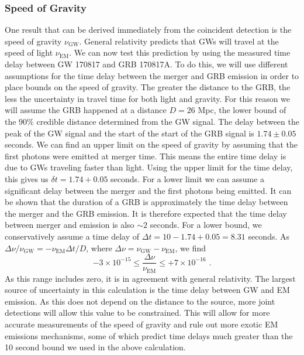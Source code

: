 \documentclass[11pt]{cuthesis}
\newcommand{\fs}{\text{ .}}
\begin{document}
\subsubsection{Speed of Gravity}
One result that can be derived immediately from the coincident detection is the speed of gravity $\nu_\text{GW}$. General relativity predicts that GWs will travel at the speed of light $\nu_\text{EM}$. We can now test this prediction by using the measured time delay between GW 170817 and GRB 170817A. To do this, we will use different assumptions for the time delay between the merger and GRB emission in order to place bounds on the speed of gravity. The greater the distance to the GRB, the less the uncertainty in travel time for both light and gravity. For this reason we will assume the GRB happened at a distance $D = 26$ Mpc, the lower bound of the $90\%$ credible distance determined from the GW signal.  The delay between the peak of the GW signal and the start of the start of the GRB signal is $1.74 \pm 0.05$ seconds. We can find an upper limit on the speed of gravity by assuming that the first photons were emitted at merger time. This means the entire time delay is due to GWs traveling faster than light. Using the upper limit for the time delay, this gives us $\delta t = 1.74 + 0.05$ seconds. For a lower limit we can assume a significant delay between the merger and the first photons being emitted. It can be shown that the duration of a GRB is approximately the time delay between the merger and the GRB emission. \cite{GW170817_GRB} It is therefore expected that the time delay between merger and emission is also $\sim2$ seconds. For a lower bound, we conservatively assume a time delay of $\Delta t = 10 - 1.74 + 0.05= 8.31$ seconds. As $\Delta \nu /\nu_\text{GW} = -\nu_\text{EM}\Delta t/D$, where $\Delta \nu = \nu_\text{GW} - \nu_\text{EM}$, we find
\begin{equation}
-3 \times 10^{-15} \leq \frac{\Delta \nu}{\nu_\text{EM}} \leq +7\times 10^{-16} \fs
\end{equation}
As this range includes zero, it is in agreement with general relativity. The largest source of uncertainty in this calculation is the time delay between GW and EM emission. As this does not depend on the distance to the source, more joint detections will allow this value to be constrained. This will allow for more accurate measurements of the speed of gravity and rule out more exotic EM emissions mechanisms, some of which predict time delays much greater than the 10 second bound we used in the above calculation.
\end{document}
